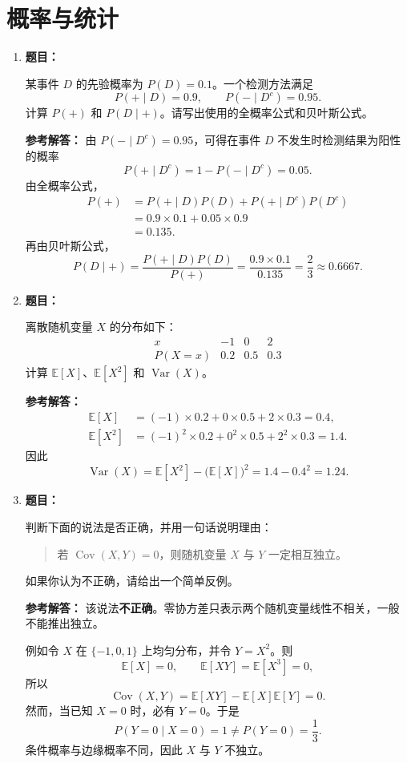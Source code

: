 \documentclass[11pt,a4paper]{article}
\newcommand{\E}{\mathbb{E}}
\newcommand{\Var}{\operatorname{Var}}
\newcommand{\Cov}{\operatorname{Cov}}
\newcommand{\ans}{\textcolor{answerblue}{\textbf{参考解答：}}}
\newenvironment{question}{%
  \par\begingroup\color{black!82}\noindent\textbf{题目：}\ignorespaces
}{%
  \par\endgroup\smallskip
}
\begin{document}
\section{概率与统计}

\begin{enumerate}
  \item
  \begin{question}
  某事件 $D$ 的先验概率为 $P(D)=0.1$。一个检测方法满足
  \[
    P(+\mid D)=0.9,
    \qquad
    P(-\mid D^c)=0.95.
  \]
  计算 $P(+)$ 和 $P(D\mid +)$。请写出使用的全概率公式和贝叶斯公式。
  \end{question}
  \ans
  由 $P(-\mid D^c)=0.95$，可得在事件 $D$ 不发生时检测结果为阳性的概率
  \[
    P(+\mid D^c)=1-P(-\mid D^c)=0.05.
  \]
  由全概率公式，
  \begin{align*}
    P(+)
    &=P(+\mid D)P(D)+P(+\mid D^c)P(D^c)\\
    &=0.9\times0.1+0.05\times0.9\\
    &=0.135.
  \end{align*}
  再由贝叶斯公式，
  \[
    P(D\mid+)
    =\frac{P(+\mid D)P(D)}{P(+)}
    =\frac{0.9\times0.1}{0.135}
    =\frac23\approx0.6667.
  \]

  \item
  \begin{question}
  离散随机变量 $X$ 的分布如下：
  \[
  \begin{array}{c|ccc}
    x & -1 & 0 & 2\\ \hline
    P(X=x) & 0.2 & 0.5 & 0.3
  \end{array}
  \]
  计算 $\E[X]$、$\E[X^2]$ 和 $\Var(X)$。
  \end{question}
  \ans
  \begin{align*}
    \E[X]
    &=(-1)\times0.2+0\times0.5+2\times0.3=0.4,\\
    \E[X^2]
    &=(-1)^2\times0.2+0^2\times0.5+2^2\times0.3=1.4.
  \end{align*}
  因此
  \[
    \Var(X)=\E[X^2]-\bigl(\E[X]\bigr)^2
    =1.4-0.4^2
    =\boxed{1.24}.
  \]

  \item
  \begin{question}
  判断下面的说法是否正确，并用一句话说明理由：
  \begin{quote}
    若 $\Cov(X,Y)=0$，则随机变量 $X$ 与 $Y$ 一定相互独立。
  \end{quote}
  如果你认为不正确，请给出一个简单反例。
  \end{question}
  \ans
  该说法\textbf{不正确}。零协方差只表示两个随机变量线性不相关，一般不能推出独立。

  例如令 $X$ 在 $\{-1,0,1\}$ 上均匀分布，并令 $Y=X^2$。则
  \[
    \E[X]=0,
    \qquad
    \E[XY]=\E[X^3]=0,
  \]
  所以
  \[
    \Cov(X,Y)=\E[XY]-\E[X]\E[Y]=0.
  \]
  然而，当已知 $X=0$ 时，必有 $Y=0$。于是
  \[
    P(Y=0\mid X=0)=1
    \ne P(Y=0)=\frac13.
  \]
  条件概率与边缘概率不同，因此 $X$ 与 $Y$ 不独立。
\end{enumerate}
\end{document}
